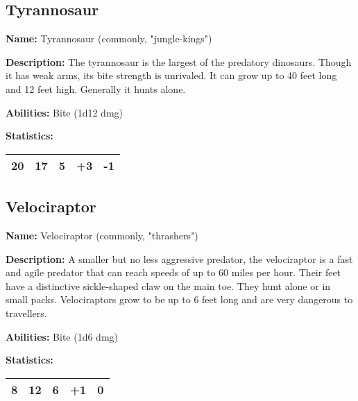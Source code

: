 \begin{multicols}{2}
\subsection{Tyrannosaur}

\textbf{Name:} Tyrannosaur (commonly, "jungle-kings") 

\textbf{Description:} The tyrannosaur is the largest of the predatory dinosaurs. Though
it has weak arms, its bite strength is unrivaled. It can grow up to 40 feet long and 12
feet high. Generally it hunts alone.

\textbf{Abilities:} Bite (1d12 dmg)

\textbf{Statistics:}

\begin{center}
{
\begin{xtabular}{|l|l|l|l|l|}
20 & 17 & 5 & +3 & -1 \\
\hline
\end{xtabular}
}
\end{center}

\subsection{Velociraptor}

\textbf{Name:} Velociraptor (commonly, "thrashers") 

\textbf{Description:} A smaller but no less aggressive predator, the velociraptor
is a fast and agile predator that can reach speeds of up to 60 miles per hour. Their
feet have a distinctive sickle-shaped claw on the main toe. They hunt alone or in small packs.
Velociraptors grow to be up to 6 feet long and are very dangerous to travellers.

\textbf{Abilities:} Bite (1d6 dmg)

\textbf{Statistics:}

\begin{center}
{
\begin{xtabular}{|l|l|l|l|l|}
8 & 12 & 6 & +1 & 0 \\
\hline
\end{xtabular}
}
\end{center}


\end{multicols}
